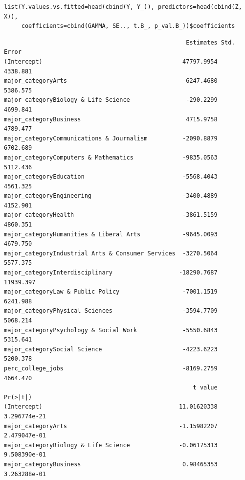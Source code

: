 \documentclass[10pt, twoside, openleft]{article}
\begin{document}
\begin{verbatim}
list(Y.values.vs.fitted=head(cbind(Y, Y_)), predictors=head(cbind(Z, X)),
     coefficients=cbind(GAMMA, SE.., t.B_, p_val.B_))$coefficients
\end{verbatim}

\begin{verbatim}
                                                    Estimates Std. Error
(Intercept)                                        47797.9954   4338.881
major_categoryArts                                 -6247.4680   5386.575
major_categoryBiology & Life Science                -290.2299   4699.841
major_categoryBusiness                              4715.9758   4789.477
major_categoryCommunications & Journalism          -2090.8879   6702.689
major_categoryComputers & Mathematics              -9835.0563   5112.436
major_categoryEducation                            -5568.4043   4561.325
major_categoryEngineering                          -3400.4889   4152.901
major_categoryHealth                               -3861.5159   4860.351
major_categoryHumanities & Liberal Arts            -9645.0093   4679.750
major_categoryIndustrial Arts & Consumer Services  -3270.5064   5577.375
major_categoryInterdisciplinary                   -18290.7687  11939.397
major_categoryLaw & Public Policy                  -7001.1519   6241.988
major_categoryPhysical Sciences                    -3594.7709   5068.214
major_categoryPsychology & Social Work             -5550.6843   5315.641
major_categorySocial Science                       -4223.6223   5200.378
perc_college_jobs                                  -8169.2759   4664.470
                                                      t value     Pr(>|t|)
(Intercept)                                       11.01620338 3.296774e-21
major_categoryArts                                -1.15982207 2.479047e-01
major_categoryBiology & Life Science              -0.06175313 9.508390e-01
major_categoryBusiness                             0.98465353 3.263288e-01

\end{verbatim}
\end{document}
